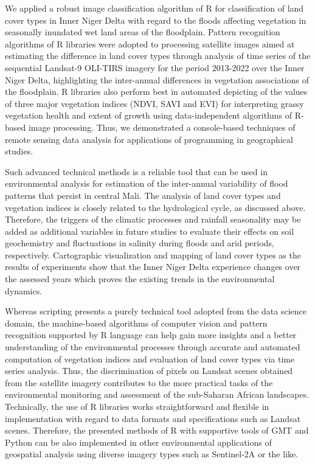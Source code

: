 \documentclass[12pt,a4paper,oneside]{article}
\def \newpar{\vspace{6pt}}
\begin{document}
\newpar We applied a robust image classification algorithm of R for classification of land cover types in Inner Niger Delta with regard to the floods affecting vegetation in seasonally inundated wet land areas of the floodplain. Pattern recognition algorithms of R libraries were adopted to processing satellite images aimed at estimating the difference in land cover types through analysis of time series of the sequential Landsat-9 OLI-TIRS imagery for the period 2013-2022 over the Inner Niger Delta, highlighting the inter-annual differences in vegetation associations of the floodplain. R libraries also perform best in automated depicting of the values of three major vegetation indices (NDVI, SAVI and EVI) for interpreting grassy vegetation health and extent of growth using data-independent algorithms of R-based image processing. Thus, we demonstrated a console-based techniques of remote sensing data analysis for applications of programming in geographical studies. 

\newpar Such advanced technical methods is a reliable tool that can be used in environmental analysis for estimation of the inter-annual variability of flood patterns that persist in central Mali. The analysis of land cover types and vegetation indices is closely related to the hydrological cycle, as discussed above. Therefore, the triggers of the climatic processes and rainfall seasonality may be added as additional variables in future studies to evaluate their effects on soil geochemistry and fluctuations in salinity during floods and arid periods, respectively. Cartographic visualization and mapping of land cover types as the results of experiments show that the Inner Niger Delta experience changes over the assessed years which proves the existing trends in the environmental dynamics.  

\newpar Whereas scripting presents a purely technical tool adopted from the data science domain, the machine-based algorithms of computer vision and pattern recognition supported by R language can help gain more insights and a better understanding of the environmental processes through accurate and automated computation of vegetation indices and evaluation of land cover types via time series analysis. Thus, the discrimination of pixels on Landsat scenes obtained from the satellite imagery contributes to the more practical tasks of the environmental monitoring and assessment of the sub-Saharan African landscapes. Technically, the use of R libraries works straightforward and flexible in implementation with regard to data formats and specifications such as Landsat scenes. Therefore, the presented methods of R with supportive tools of GMT and Python can be also implemented in other environmental applications of geospatial analysis using diverse imagery types such as Sentinel-2A or the like. 
\end{document}
